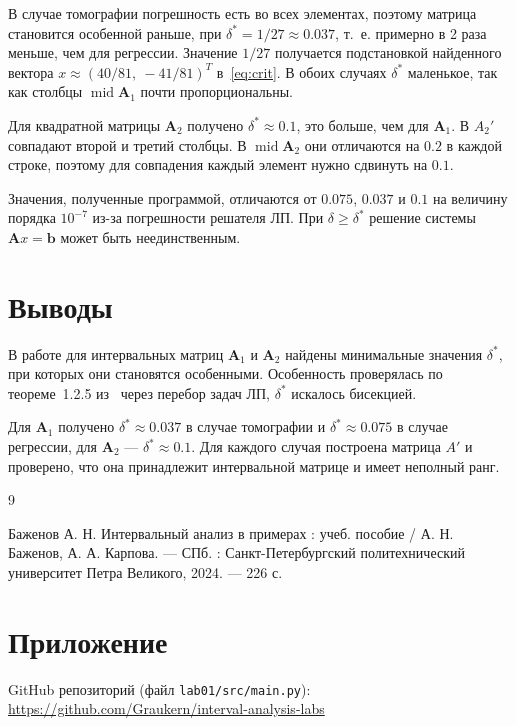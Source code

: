 \documentclass[a4paper, 14pt]{extarticle}
\begin{document}
В случае томографии погрешность есть во всех элементах, поэтому матрица становится особенной раньше, при $\delta^* = 1/27 \approx 0.037$, т.~е. примерно в 2 раза меньше, чем для регрессии. Значение $1/27$ получается подстановкой найденного вектора $x \approx (40/81,\ -41/81)^T$ в~\eqref{eq:crit}. В обоих случаях $\delta^*$ маленькое, так как столбцы $\operatorname{mid}\mathbf{A}_1$ почти пропорциональны.

Для квадратной матрицы $\mathbf{A}_2$ получено $\delta^* \approx 0.1$, это больше, чем для $\mathbf{A}_1$. В $A_2'$ совпадают второй и третий столбцы. В $\operatorname{mid}\mathbf{A}_2$ они отличаются на $0.2$ в каждой строке, поэтому для совпадения каждый элемент нужно сдвинуть на $0.1$.

Значения, полученные программой, отличаются от $0.075$, $0.037$ и $0.1$ на величину порядка $10^{-7}$ из-за погрешности решателя ЛП. При $\delta \ge \delta^*$ решение системы $\mathbf{A}x = \mathbf{b}$ может быть неединственным.

\section{Выводы}

В работе для интервальных матриц $\mathbf{A}_1$ и $\mathbf{A}_2$ найдены минимальные значения $\delta^*$, при которых они становятся особенными. Особенность проверялась по теореме~1.2.5 из~\cite{bazhenov} через перебор задач ЛП, $\delta^*$ искалось бисекцией.

Для $\mathbf{A}_1$ получено $\delta^* \approx 0.037$ в случае томографии и $\delta^* \approx 0.075$ в случае регрессии, для $\mathbf{A}_2$ --- $\delta^* \approx 0.1$. Для каждого случая построена матрица $A'$ и проверено, что она принадлежит интервальной матрице и имеет неполный ранг.
 
\renewcommand{\refname}{\thesection\ Список литературы}

\begin{thebibliography}{9}

    Баженов А. Н. Интервальный анализ в примерах : учеб. пособие / А. Н. Баженов, А. А. Карпова. --- СПб. : Санкт-Петербургский политехнический университет Петра Великого, 2024. --- 226 с.

\end{thebibliography}

\section{Приложение}

GitHub репозиторий (файл \texttt{lab01/src/main.py}): \\
\url{https://github.com/Graukern/interval-analysis-labs}
 
\end{document}
